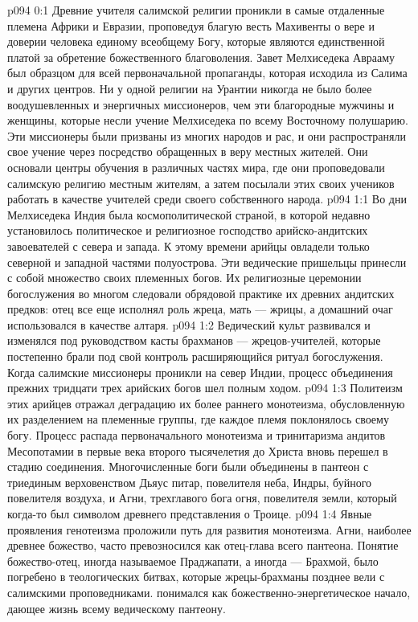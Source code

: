 \author{Мелхиседек}
\vs p094 0:1 Древние учителя салимской религии проникли в самые отдаленные племена Африки и Евразии, проповедуя благую весть Махивенты о вере и доверии человека единому всеобщему Богу, которые являются единственной платой за обретение божественного благоволения. Завет Мелхиседека Аврааму был образцом для всей первоначальной пропаганды, которая исходила из Салима и других центров. Ни у одной религии на Урантии никогда не было более воодушевленных и энергичных миссионеров, чем эти благородные мужчины и женщины, которые несли учение Мелхиседека по всему Восточному полушарию. Эти миссионеры были призваны из многих народов и рас, и они распространяли свое учение через посредство обращенных в веру местных жителей. Они основали центры обучения в различных частях мира, где они проповедовали салимскую религию местным жителям, а затем посылали этих своих учеников работать в качестве учителей среди своего собственного народа.
\vs p094 1:1 Во дни Мелхиседека Индия была космополитической страной, в которой недавно установилось политическое и религиозное господство арийско\hyp{}андитских завоевателей с севера и запада. К этому времени арийцы овладели только северной и западной частями полуострова. Эти ведические пришельцы принесли с собой множество своих племенных богов. Их религиозные церемонии богослужения во многом следовали обрядовой практике их древних андитских предков: отец все еще исполнял роль жреца, мать --- жрицы, а домашний очаг использовался в качестве алтаря.
\vs p094 1:2 Ведический культ развивался и изменялся под руководством касты брахманов --- жрецов\hyp{}учителей, которые постепенно брали под свой контроль расширяющийся ритуал богослужения. Когда салимские миссионеры проникли на север Индии, процесс объединения прежних тридцати трех арийских богов шел полным ходом.
\vs p094 1:3 Политеизм этих арийцев отражал деградацию их более раннего монотеизма, обусловленную их разделением на племенные группы, где каждое племя поклонялось своему богу. Процесс распада первоначального монотеизма и тринитаризма андитов Месопотамии в первые века второго тысячелетия до Христа вновь перешел в стадию соединения. Многочисленные боги были объединены в пантеон с триединым верховенством Дьяус питар, повелителя неба, Индры, буйного повелителя воздуха, и Агни, трехглавого бога огня, повелителя земли, который когда\hyp{}то был символом древнего представления о Троице.
\vs p094 1:4 Явные проявления генотеизма проложили путь для развития монотеизма. Агни, наиболее древнее божество, часто превозносился как отец\hyp{}глава всего пантеона. Понятие божество\hyp{}отец, иногда называемое Праджапати, а иногда --- Брахмой, было погребено в теологических битвах, которые жрецы\hyp{}брахманы позднее вели с салимскими проповедниками.  понимался как божественно\hyp{}энергетическое начало, дающее жизнь всему ведическому пантеону.
